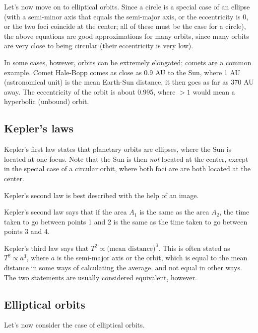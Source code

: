 Let's now move on to elliptical orbits. Since a circle is a special case of an ellipse (with a semi-minor axis that equals the semi-major axis, or the eccentricity is 0, or the two foci coincide at the center; all of these must be the case for a circle), the above equations are good approximations for many orbits, since many orbits are very close to being circular (their eccentricity is very low).

In some cases, however, orbits can be extremely elongated; comets are a common example. Comet Hale-Bopp comes as close as 0.9 AU to the Sun, where 1 AU (astronomical unit) is the mean Earth-Sun distance, it then goes as far as 370 AU away. The eccentricity of the orbit is about 0.995, where $>1$ would mean a hyperbolic (unbound) orbit.

\subsection{Kepler's laws}

Kepler's first law states that planetary orbits are ellipses, where the Sun is located at one focus. Note that the Sun is then \emph{not} located at the center, except in the special case of a circular orbit, where both foci are are both located at the center.

Kepler's second law is best described with the help of an image.


Kepler's second law says that if the area $A_1$ is the same as the area $A_2$, the time taken to go between points 1 and 2 is the same as the time taken to go between points 3 and 4.

Kepler's third law says that $T^2 \propto \text{(mean distance)}^3$. This is often stated as $T^2 \propto a^3$, where $a$ is the semi-major axis or the orbit, which is equal to the mean distance in some ways of calculating the average, and not equal in other ways. The two statements are usually considered equivalent, however.

\subsection{Elliptical orbits}

Let's now consider the case of elliptical orbits.

